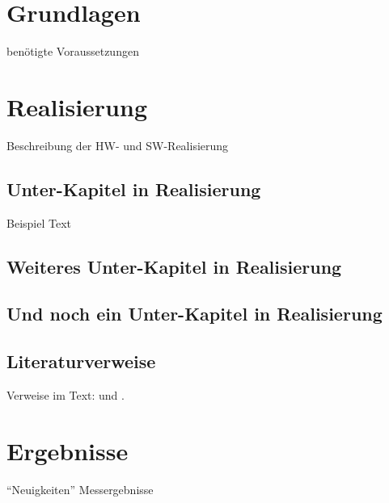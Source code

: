 
\chapter{Grundlagen}
\label{sec:grundl}
benötigte Voraussetzungen

\chapter{Realisierung}
\label{sec:real}
Beschreibung der HW- und SW-Realisierung

\section{Unter-Kapitel in Realisierung}
\label{sec:real-unter}
Beispiel Text


\newpage
\section{Weiteres Unter-Kapitel in Realisierung}
\label{sec:real-unterWeiter}

\newpage
\section{Und noch ein Unter-Kapitel in Realisierung}
\label{sec:real-unterWeiterNoch}

\section{Literaturverweise}
\label{sec:real-literatur}

Verweise im Text: \cite{doc:stz} und \cite{doc:gun}.

\chapter{Ergebnisse}
\label{sec:ergeb}
\enquote{Neuigkeiten} Messergebnisse
